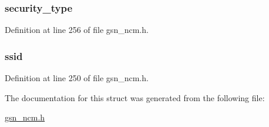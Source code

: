 \hypertarget{a00156_a21e76f719b06d1894aaf4cafcb6442ff}{
\subsubsection[{security\_\-type}]{ {\bf security\_\-type}}}
\label{a00156_a21e76f719b06d1894aaf4cafcb6442ff}


Definition at line 256 of file gsn\_\-ncm.h.

\hypertarget{a00156_a1bc7788a828e29446580aa10a5ac2932}{
\subsubsection[{ssid}]{ {\bf ssid}}}
\label{a00156_a1bc7788a828e29446580aa10a5ac2932}


Definition at line 250 of file gsn\_\-ncm.h.



The documentation for this struct was generated from the following file:\begin{DoxyCompactItemize}
\item 
\hyperlink{a00529}{gsn\_\-ncm.h}\end{DoxyCompactItemize}
